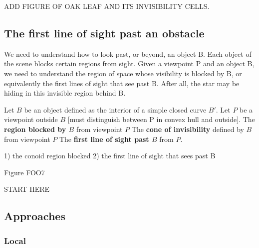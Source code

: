 \documentclass[12pt]{article}
\begin{document}
ADD FIGURE OF OAK LEAF AND ITS INVISIBILITY CELLS.

\clearpage

\subsection{The first line of sight past an obstacle}

We need to understand how to look past, or beyond, an object B.
Each object of the scene blocks certain regions from sight.
Given a viewpoint P and an object B, we need to understand the region of space
whose visibility is blocked by B, or equivalently the first lines of sight
that see past B.
After all, the star may be hiding in this invisible region behind B.

\begin{defn2}
Let $B$ be an object defined as the interior of a simple closed curve $B'$.
Let $P$ be a viewpoint outside $B$ [must distinguish between P in convex hull and outside].
The {\bf region blocked by $B$} from viewpoint $P$
The {\bf cone of invisibility} defined by $B$ from viewpoint $P$
The {\bf first line of sight past $B$} from $P$.
\end{defn2}

1) the conoid region blocked
2) the first line of sight that sees past B

Figure FOO7

\clearpage

START HERE

\subsection{Approaches}

\subsubsection{Local}
\end{document}
